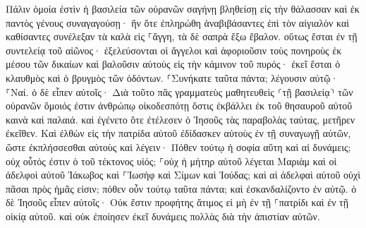 \documentclass[twoside, 9pt]{extreport}
\begin{document}
Πάλιν ὁμοία ἐστὶν ἡ βασιλεία τῶν οὐρανῶν σαγήνῃ βληθείσῃ εἰς τὴν θάλασσαν καὶ ἐκ παντὸς γένους συναγαγούσῃ· 
ἣν ὅτε ἐπληρώθη ἀναβιβάσαντες ἐπὶ τὸν αἰγιαλὸν καὶ καθίσαντες συνέλεξαν τὰ καλὰ εἰς ⸀ἄγγη, τὰ δὲ σαπρὰ ἔξω ἔβαλον. 
οὕτως ἔσται ἐν τῇ συντελείᾳ τοῦ αἰῶνος· ἐξελεύσονται οἱ ἄγγελοι καὶ ἀφοριοῦσιν τοὺς πονηροὺς ἐκ μέσου τῶν δικαίων 
καὶ βαλοῦσιν αὐτοὺς εἰς τὴν κάμινον τοῦ πυρός· ἐκεῖ ἔσται ὁ κλαυθμὸς καὶ ὁ βρυγμὸς τῶν ὀδόντων. 
⸀Συνήκατε ταῦτα πάντα; λέγουσιν αὐτῷ· ⸀Ναί. 
ὁ δὲ εἶπεν αὐτοῖς· Διὰ τοῦτο πᾶς γραμματεὺς μαθητευθεὶς ⸂τῇ βασιλείᾳ⸃ τῶν οὐρανῶν ὅμοιός ἐστιν ἀνθρώπῳ οἰκοδεσπότῃ ὅστις ἐκβάλλει ἐκ τοῦ θησαυροῦ αὐτοῦ καινὰ καὶ παλαιά. 
καὶ ἐγένετο ὅτε ἐτέλεσεν ὁ Ἰησοῦς τὰς παραβολὰς ταύτας, μετῆρεν ἐκεῖθεν. 
Καὶ ἐλθὼν εἰς τὴν πατρίδα αὐτοῦ ἐδίδασκεν αὐτοὺς ἐν τῇ συναγωγῇ αὐτῶν, ὥστε ἐκπλήσσεσθαι αὐτοὺς καὶ λέγειν· Πόθεν τούτῳ ἡ σοφία αὕτη καὶ αἱ δυνάμεις; 
οὐχ οὗτός ἐστιν ὁ τοῦ τέκτονος υἱός; ⸀οὐχ ἡ μήτηρ αὐτοῦ λέγεται Μαριὰμ καὶ οἱ ἀδελφοὶ αὐτοῦ Ἰάκωβος καὶ ⸀Ἰωσὴφ καὶ Σίμων καὶ Ἰούδας; 
καὶ αἱ ἀδελφαὶ αὐτοῦ οὐχὶ πᾶσαι πρὸς ἡμᾶς εἰσιν; πόθεν οὖν τούτῳ ταῦτα πάντα; 
καὶ ἐσκανδαλίζοντο ἐν αὐτῷ. ὁ δὲ Ἰησοῦς εἶπεν αὐτοῖς· Οὐκ ἔστιν προφήτης ἄτιμος εἰ μὴ ἐν τῇ ⸀πατρίδι καὶ ἐν τῇ οἰκίᾳ αὐτοῦ. 
καὶ οὐκ ἐποίησεν ἐκεῖ δυνάμεις πολλὰς διὰ τὴν ἀπιστίαν αὐτῶν. 
\end{document}
